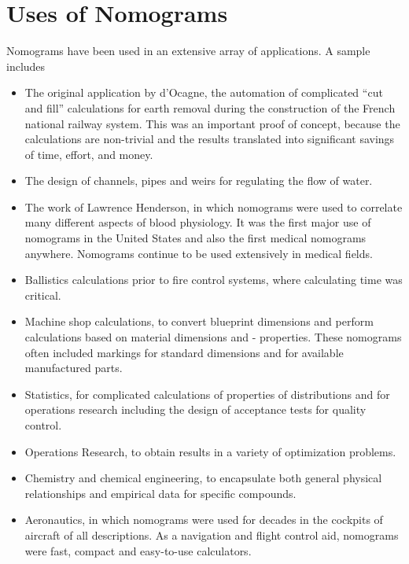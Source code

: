 \documentclass[a4paper,11pt,english]{sphinxmanual}
\begin{document}
\section{Uses of Nomograms}
\label{\detokenize{introduction/introduction:uses-of-nomograms}}
Nomograms have been used in an extensive array of applications. A sample includes
\begin{itemize}
\item {} 
The original application by d’Ocagne, the automation of complicated “cut and fill” calculations for earth removal during the construction of the French national railway system. This was an important proof of concept, because the calculations are non-trivial and the results translated into significant savings of time, effort, and money.

\item {} 
The design of channels, pipes and weirs for regulating the flow of water.

\item {} 
The work of Lawrence Henderson, in which nomograms were used to correlate many different aspects of blood physiology. It was the first major use of nomograms in the United States and also the first medical nomograms anywhere. Nomograms continue to be used extensively in medical fields.

\item {} 
Ballistics calculations prior to fire control systems, where calculating time was critical.

\item {} 
Machine shop calculations, to convert blueprint dimensions and perform calculations based on material dimensions and - properties. These nomograms often included markings for standard dimensions and for available manufactured parts.

\item {} 
Statistics, for complicated calculations of properties of distributions and for operations research including the design of acceptance tests for quality control.

\item {} 
Operations Research, to obtain results in a variety of optimization problems.

\item {} 
Chemistry and chemical engineering, to encapsulate both general physical relationships and empirical data for specific compounds.

\item {} 
Aeronautics, in which nomograms were used for decades in the cockpits of aircraft of all descriptions. As a navigation and flight control aid, nomograms were fast, compact and easy-to-use calculators.


\end{itemize}
\end{document}
